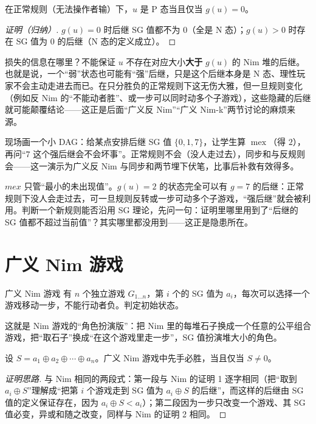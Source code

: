 \begin{theorem}[SG 值刻画 P 态]\label{thm:sgzero}
在正常规则（无法操作者输）下，$u$ 是 P 态当且仅当 $g(u)=0$。
\end{theorem}
\begin{proof}[证明（归纳）]
$g(u)=0$ 时后继 SG 值都不为 $0$（全是 N 态）；$g(u)>0$ 时存在 SG 值为 $0$ 的后继（N 态的定义成立）。
\end{proof}

损失的信息在哪里？不能保证 $u$ 不存在对应大小\textbf{大于} $g(u)$ 的 Nim 堆的后继。也就是说，一个“弱”状态也可能有“强”后继，只是这个后继本身是 N 态、理性玩家不会主动走进去而已。在只分胜负的正常规则下这无伤大雅，但一旦规则变化（例如反 Nim 的“不能动者胜”、或一步可以同时动多个子游戏），这些隐藏的后继就可能颠覆结论——这正是后面“广义反 Nim”“广义 Nim-k”两节讨论的麻烦来源。

\begin{teach}
现场画一个小 DAG：给某点安排后继 SG 值 $\{0,1,7\}$，让学生算 $\operatorname{mex}$（得 $2$），再问“$7$ 这个强后继会不会坏事”。正常规则不会（没人走过去），同步和与反规则会——这一演示为广义反 Nim 与同步和两节埋下伏笔，比事后补救有效得多。
\end{teach}
\begin{pitfall}
$mex$ 只管“最小的未出现值”。$g(u)=2$ 的状态完全可以有 $g=7$ 的后继：正常规则下没人会走过去，可一旦规则反转或一步可动多个子游戏，“强后继”就会被利用。判断一个新规则能否沿用 SG 理论，先问一句：证明里哪里用到了“后继的 SG 值都不超过当前值”？其实哪里都没用到——这正是隐患所在。
\end{pitfall}

\section{广义 Nim 游戏}
\begin{problem}{广义 Nim 游戏}
有 $n$ 个独立游戏 $G_{1\ldots n}$，第 $i$ 个的 SG 值为 $a_i$，每次可以选择一个游戏移动一步，不能行动者负。判定初始状态。
\end{problem}

这就是 Nim 游戏的“角色扮演版”：把 Nim 里的每堆石子换成一个任意的公平组合游戏，把“取石子”换成“在这个游戏里走一步”，SG 值扮演堆大小的角色。

\begin{corollary}[广义 Nim 判定]
设 $S=a_1\oplus a_2\oplus\cdots\oplus a_n$。广义 Nim 游戏中先手必胜，当且仅当 $S\ne0$。
\end{corollary}
\begin{proof}[证明思路]
与 Nim 相同的两段式：第一段与 Nim 的证明 1 逐字相同（把“取到 $a_i\oplus S$”理解成“把第 $i$ 个游戏走到 SG 值为 $a_i\oplus S$ 的后继”，而这样的后继由 SG 值的定义保证存在，因为 $a_i\oplus S<a_i$）；第二段因为一步只改变一个游戏、其 SG 值必变，异或和随之改变，同样与 Nim 的证明 2 相同。
\end{proof}

